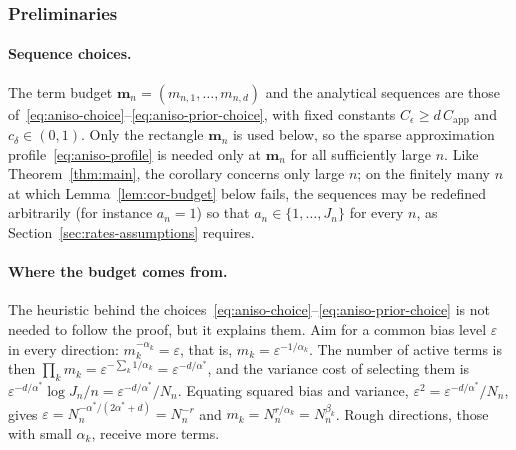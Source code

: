 \subsubsection*{Preliminaries}

\paragraph*{Sequence choices.}
The term budget $\boldsymbol m_n=(m_{n,1},\ldots,m_{n,d})$ and the analytical sequences are those of~\eqref{eq:aniso-choice}--\eqref{eq:aniso-prior-choice}, with fixed constants $C_\epsilon\geq d\,C_{\mathrm{app}}$ and $c_\delta\in(0,1)$. Only the rectangle $\boldsymbol m_n$ is used below, so the sparse approximation profile~\eqref{eq:aniso-profile} is needed only at $\boldsymbol m_n$ for all sufficiently large $n$. Like Theorem~\ref{thm:main}, the corollary concerns only large $n$; on the finitely many $n$ at which Lemma~\ref{lem:cor-budget} below fails, the sequences may be redefined arbitrarily (for instance $a_n=1$) so that $a_n\in\{1,\ldots,J_n\}$ for every $n$, as Section~\ref{sec:rates-assumptions} requires.

\paragraph*{Where the budget comes from.}
The heuristic behind the choices~\eqref{eq:aniso-choice}--\eqref{eq:aniso-prior-choice} is not needed to follow the proof, but it explains them. Aim for a common bias level $\varepsilon$ in every direction: $m_k^{-\alpha_k}=\varepsilon$, that is, $m_k=\varepsilon^{-1/\alpha_k}$. The number of active terms is then $\prod_km_k=\varepsilon^{-\sum_k1/\alpha_k}=\varepsilon^{-d/\alpha^*}$, and the variance cost of selecting them is $\varepsilon^{-d/\alpha^*}\log J_n/n=\varepsilon^{-d/\alpha^*}/N_n$. Equating squared bias and variance, $\varepsilon^2=\varepsilon^{-d/\alpha^*}/N_n$, gives $\varepsilon=N_n^{-\alpha^*/(2\alpha^*+d)}=N_n^{-r}$ and $m_k=N_n^{r/\alpha_k}=N_n^{\beta_k}$. Rough directions, those with small $\alpha_k$, receive more terms.

